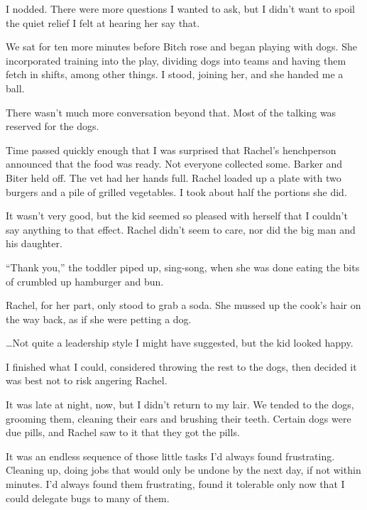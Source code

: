 I nodded.  There were more questions I wanted to ask, but I didn't want to spoil the quiet relief I felt at hearing her say that.



We sat for ten more minutes before Bitch rose and began playing with dogs.  She incorporated training into the play, dividing dogs into teams and having them fetch in shifts, among other things.  I stood, joining her, and she handed me a ball.



There wasn't much more conversation beyond that.  Most of the talking was reserved for the dogs.



Time passed quickly enough that I was surprised that Rachel's henchperson announced that the food was ready.  Not everyone collected some.  Barker and Biter held off.  The vet had her hands full.  Rachel loaded up a plate with two burgers and a pile of grilled vegetables.  I took about half the portions she did.



It wasn't very good, but the kid seemed so pleased with herself that I couldn't say anything to that effect.  Rachel didn't seem to care, nor did the big man and his daughter.



``Thank you,'' the toddler piped up, sing-song, when she was done eating the bits of crumbled up hamburger and bun.



Rachel, for her part, only stood to grab a soda.  She mussed up the cook's hair on the way back, as if she were petting a dog.



\ldots{}Not quite a leadership style I might have suggested, but the kid looked happy.



I finished what I could, considered throwing the rest to the dogs, then decided it was best not to risk angering Rachel.



It was late at night, now, but I didn't return to my lair.  We tended to the dogs, grooming them, cleaning their ears and brushing their teeth.  Certain dogs were due pills, and Rachel saw to it that they got the pills.



It was an endless sequence of those little tasks I'd always found frustrating.  Cleaning up, doing jobs that would only be undone by the next day, if not within minutes.  I'd always found them frustrating, found it tolerable only now that I could delegate bugs to many of them.




